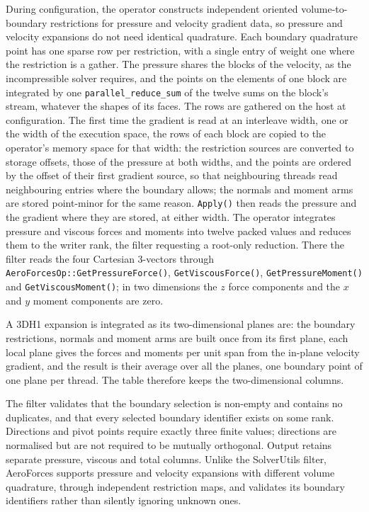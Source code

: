 During configuration, the operator constructs independent oriented
volume-to-boundary restrictions for pressure and velocity gradient data, so
pressure and velocity expansions do not need identical quadrature. Each
boundary quadrature point has one sparse row per restriction, with a single
entry of weight one where the restriction is a gather. The pressure shares the
blocks of the velocity, as the incompressible solver requires, and the points
on the elements of one block are integrated by one
\texttt{parallel\_reduce\_sum} of the twelve sums on the block's stream,
whatever the shapes of its faces. The rows are gathered on the host at
configuration. The first time the gradient is read at an interleave width, one
or the width of the execution space, the rows of each block are copied to the
operator's memory space for that width: the restriction sources are converted
to storage offsets, those of the pressure at both widths, and the points are
ordered by the offset of their first gradient source, so that neighbouring
threads read neighbouring entries where the boundary allows; the normals and
moment arms are stored point-minor for the same reason. \texttt{Apply()} then
reads the pressure and the gradient where they are stored, at either width. The
operator integrates pressure and viscous forces and moments into twelve packed
values and reduces them to the writer rank, the filter requesting a root-only
reduction. There the filter reads the four
Cartesian 3-vectors through \texttt{AeroForcesOp::GetPressureForce()},
\texttt{GetViscousForce()}, \texttt{GetPressureMoment()} and
\texttt{GetViscousMoment()}; in two dimensions the $z$ force components and
the $x$ and $y$ moment components are zero.

A 3DH1 expansion is integrated as its two-dimensional planes are: the
boundary restrictions, normals and moment arms are built once from its first
plane, each local plane gives the forces and moments per unit span from the
in-plane velocity gradient, and the result is their average over all the
planes, one boundary point of one plane per thread. The table therefore keeps
the two-dimensional columns.

The filter validates that the boundary selection is non-empty and contains no
duplicates, and that every selected boundary identifier exists on some rank.
Directions and pivot points require exactly three finite values; directions are
normalised but are not required to be mutually orthogonal. Output retains
separate pressure, viscous and total columns.
Unlike the SolverUtils filter, AeroForces supports pressure and velocity
expansions with different volume quadrature, through independent restriction
maps, and validates its boundary identifiers rather than silently ignoring
unknown ones.

